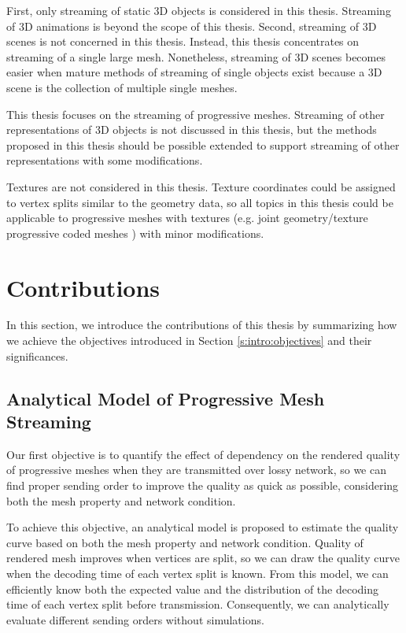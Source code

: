             First, only streaming of static 3D objects is considered in this thesis. 
            Streaming of 3D animations is beyond the scope of this thesis. 
            Second, streaming of 3D scenes is not concerned in this thesis.
            Instead, this thesis concentrates on streaming of a single large mesh.
            Nonetheless, streaming of 3D scenes becomes easier when mature methods
            of streaming of single objects exist because a 3D scene is the collection
            of multiple single meshes.
            
            This thesis focuses on the streaming of progressive meshes. 
            Streaming of other representations of 3D objects is not discussed in this thesis,
            but the methods proposed in this thesis should be possible
            extended to support streaming of other representations with some modifications.
            
            Textures are not considered in this thesis. Texture coordinates could be assigned
            to vertex splits similar to the geometry data, so all topics in this thesis could
            be applicable to progressive meshes with textures (e.g. joint geometry/texture progressive coded meshes 
            \cite{joint:okuda}) with minor modifications. 
  \section{Contributions}
  \label{s:intro:contributions}
    In this section, we introduce the contributions of this thesis by
    summarizing how we achieve the objectives introduced in 
    Section \ref{s:intro:objectives} and their significances.
    
    \subsection{Analytical Model of Progressive Mesh Streaming}
    Our first objective is to quantify the effect of dependency
    on the rendered quality of progressive meshes when they are
    transmitted over lossy network, so we can find proper sending
    order to improve the quality as quick as possible,
    considering both the mesh property and network condition. 
            
    To achieve this objective, an analytical model is proposed
    to estimate the quality curve based on both
    the mesh property and network condition. 
    Quality of rendered mesh improves when vertices are split,
    so we can draw the quality curve when the decoding time
    of each vertex split is known.
    From this model, we can efficiently know both the expected 
    value and the distribution of the decoding time of each
    vertex split before transmission. Consequently, 
    we can analytically evaluate different sending orders without simulations.
    

